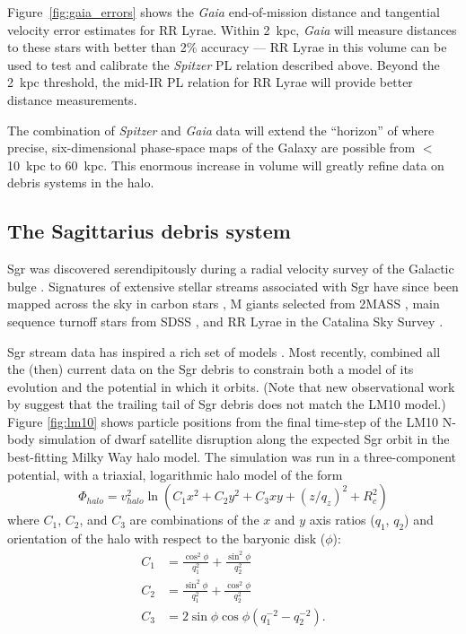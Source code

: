 Figure~\ref{fig:gaia_errors} shows the {\it Gaia} end-of-mission distance
and tangential velocity error estimates for RR Lyrae. Within 2~kpc, {\it Gaia} will measure distances to these stars with
better than 2\% accuracy --- RR Lyrae in this volume can be used to
test and calibrate the {\it Spitzer} PL relation described above. Beyond the
2~kpc threshold, the mid-IR PL relation for RR Lyrae will provide better 
distance measurements. 

The combination of {\it Spitzer} and {\it Gaia} data will 
extend the ``horizon'' of where precise, six-dimensional phase-space 
maps of the Galaxy are possible from $<$10~kpc to 60~kpc. This enormous 
increase in volume will greatly refine data on debris systems in the halo.

\subsection{The Sagittarius debris system}
\label{sec:sgr}
Sgr was discovered serendipitously during a radial velocity 
survey of the Galactic bulge \citep{ibata94}. 
Signatures of extensive stellar
streams associated with Sgr have since  been
mapped across the sky in carbon stars \citep{totten98}, M giants
selected from 2MASS \citep{majewski03}, main
sequence turnoff stars from SDSS
\citep{belokurov06}, and RR Lyrae in the Catalina Sky Survey
\citep{drake13}. 

Sgr stream data has inspired a rich set of  models 
\citep[e.g.,][]{johnston99b, fellhauer06}.
Most recently, \citet[][hereafter LM10]{law10} combined all
the (then) current data on the Sgr debris to constrain both a model of its evolution
and the potential in which it orbits. (Note that new observational work by 
\citet{belokurov13} suggest that the trailing tail of Sgr debris does not
match the LM10 model.)
Figure \ref{fig:lm10} shows particle positions
from the final time-step of the LM10 N-body
simulation of dwarf satellite disruption along the expected Sgr orbit
in the best-fitting Milky Way halo model. The simulation was
run in a three-component potential, with a triaxial, logarithmic halo
model of the form
\begin{equation}
  \Phi_{halo} = v_{halo}^2 \ln(C_1 x^2 + C_2 y^2 + C_3 xy + (z/q_z)^2 + R_c^2)
\end{equation}
where $C_1$, $C_2$, and $C_3$ are combinations of the $x$ and $y$ axis
ratios ($q_1$, $q_2$) and orientation of the halo with respect to the
baryonic disk ($\phi$):
\begin{align}
  C_1 &= \frac{\cos^2\phi}{q_1^2} + \frac{\sin^2\phi}{q_2^2}\\
  C_2 &= \frac{\sin^2\phi}{q_1^2} + \frac{\cos^2\phi}{q_2^2}\\
  C_3 &= 2\sin\phi\cos\phi \left(q_1^{-2} - q_2^{-2}\right).
\end{align}


